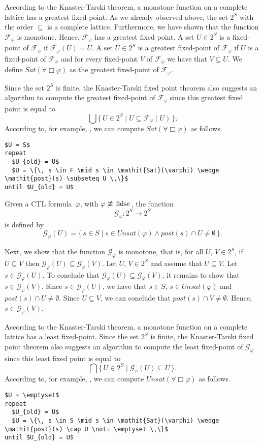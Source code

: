 \documentclass[12pt]{article}
\newcommand{\always}{\Box}
\newcommand{\FALSE}{\mbox{\lstinline{false}}}
\theoremstyle{definition}
\begin{document}
According to the Knaster-Tarski theorem, a monotone function on a complete lattice has a greatest fixed-point.  As we already observed above, the set $2^S $ with the order $\subseteq$ is a complete lattice.  Furthermore, we have shown that the function $\mathcal{F}_{\varphi}$ is monotone.  Hence, $\mathcal{F}_{\varphi}$ has a greatest fixed point.  A set $U \in 2^S$ is a fixed-point of $\mathcal{F}_{\varphi}$ if $\mathcal{F}_{\varphi}(U) = U$.  A set $U \in 2^S$ is a greatest fixed-point of $\mathcal{F}_{\varphi}$ if $U$ is a fixed-point of $\mathcal{F}_{\varphi}$ and for every fixed-point $V$ of $\mathcal{F}_{\varphi}$ we have that $V \subseteq U$.  We define $\mathit{Sat}(\forall \always \varphi)$ as the greatest fixed-point of $\mathcal{F}_{\varphi}$.

Since the set $2^S$ is finite, the Knaster-Tarski fixed point theorem also suggests an algorithm to compute the greatest fixed-point of $\mathcal{F}_{\varphi}$ since this greatest fixed point is equal to
\[
\bigcup \{\, U \in 2^S \mid U \subseteq \mathcal{F}_{\varphi}(U) \,\}.
\]
According to, for example, \cite[Section~6.2]{CGP99}, we can compute $\mathit{Sat}(\forall \always \varphi)$ as follows.
\begin{lstlisting}
$U = S$
repeat
  $U_{old} = U$
  $U = \{\, s \in F \mid s \in \mathit{Sat}(\varphi) \wedge \mathit{post}(s) \subseteq U \,\}$
until $U_{old} = U$
\end{lstlisting}

\color{red}
Given a CTL formula~$\varphi$, with $\varphi \not\equiv \FALSE$, the function
\[
\mathcal{G}_{\varphi} : 2^S \to 2^S
\]
is defined by
\[
\mathcal{G}_{\varphi}(U) = \{\, s \in S \mid s \in \mathit{Unsat}(\varphi) \wedge \mathit{post}(s) \cap U \not= \emptyset \,\}.
\]

Next, we show that the function $\mathcal{G}_{\varphi}$ is monotone, that is, for all $U$, $V \in 2^S$, if $U \subseteq V$ then $\mathcal{G}_{\varphi}(U) \subseteq \mathcal{G}_{\varphi}(V)$.  Let $U$, $V \in 2^S$ and assume that $U \subseteq V$.  Let $s \in \mathcal{G}_{\varphi}(U)$. To conclude that $\mathcal{G}_{\varphi}(U) \subseteq \mathcal{G}_{\varphi}(V)$, it remains to show that $s \in \mathcal{G}_{\varphi}(V)$.  Since $s \in \mathcal{G}_{\varphi}(U)$, we have that $s \in S$, $s \in \mathit{Unsat}(\varphi)$ and $\mathit{post}(s) \cap U \not= \emptyset$.  Since $U \subseteq V$, we can conclude that $\mathit{post}(s) \cap V \not= \emptyset$.  Hence, $s \in \mathcal{G}_{\varphi}(V)$.

According to the Knaster-Tarski theorem, a monotone function on a complete lattice has a least fixed-point.  Since the set $2^S$ is finite, the Knaster-Tarski fixed point theorem also suggests an algorithm to compute the least fixed-point of $\mathcal{G}_{\varphi}$ since this least fixed point is equal to
\[
\bigcap \{\, U \in 2^S \mid \mathcal{G}_{\varphi}(U) \subseteq U \,\}.
\]
According to, for example, \cite[Section~6.2]{CGP99}, we can compute $\mathit{Unsat}(\forall \always \varphi)$ as follows.
\begin{lstlisting}
$U = \emptyset$
repeat
  $U_{old} = U$
  $U = \{\, s \in S \mid s \in \mathit{Sat}(\varphi) \wedge \mathit{post}(s) \cap U \not= \emptyset \,\}$
until $U_{old} = U$
\end{lstlisting}
\end{document}
